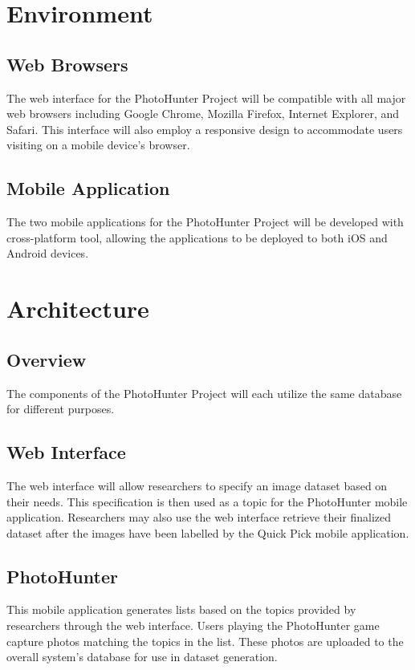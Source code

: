 \documentclass{article}
\begin{document}
\section{Environment}
\subsection{Web Browsers}
The web interface for the PhotoHunter Project will be compatible with all major web browsers including Google Chrome, Mozilla Firefox, Internet Explorer, and Safari. This interface will also employ a responsive design to accommodate users visiting on a mobile device's browser.

\subsection{Mobile Application}
The two mobile applications for the PhotoHunter Project will be developed with cross-platform tool, allowing the applications to be deployed to both iOS and Android devices. 

\section{Architecture}

\subsection{Overview}
The components of the PhotoHunter Project will each utilize the same database for different purposes.

\subsection{Web Interface}
The web interface will allow researchers to specify an image dataset based on their needs. This specification is then used as a topic for the PhotoHunter mobile application. Researchers may also use the web interface retrieve their finalized dataset after the images have been labelled by the Quick Pick mobile application. 

\subsection{PhotoHunter}
This mobile application generates lists based on the topics provided by researchers through the web interface. Users playing the PhotoHunter game capture photos matching the topics in the list. These photos are uploaded to the overall system's database for use in dataset generation.
\end{document}
